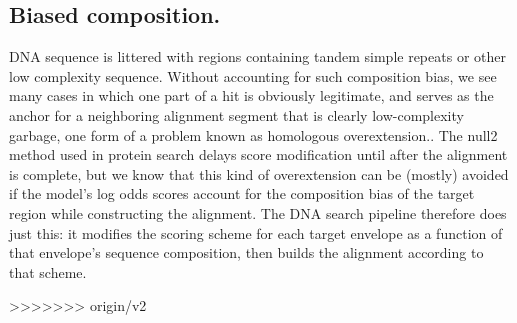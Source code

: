 \subsection{Biased composition.}

DNA sequence is littered with regions containing tandem simple repeats
or other low complexity sequence. Without accounting for such
composition bias, we see many cases in which one part of a hit is
obviously legitimate, and serves as the anchor for a neighboring
alignment segment that is clearly low-complexity garbage, one form of
a problem known as homologous overextension.\cite{Gonzalez10}. The
null2 method used in protein search delays score modification until
after the alignment is complete, but we know that this kind of
overextension can be (mostly) avoided if the model's log odds scores
account for the composition bias of the target region while
constructing the alignment. The DNA search pipeline therefore does
just this: it modifies the scoring scheme for each target envelope as
a function of that envelope's sequence composition, then builds the
alignment according to that scheme.





>>>>>>> origin/v2
